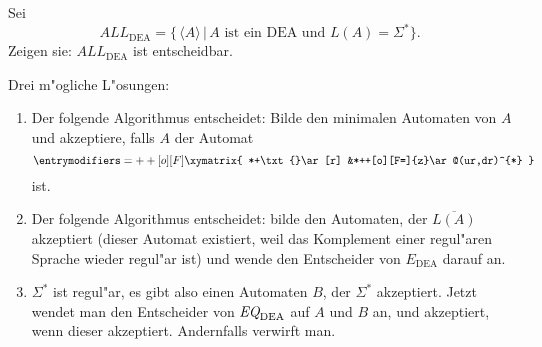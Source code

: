 Sei
\[
{ALL}_{\text{DEA}}=\{\, \langle A\rangle\, |\, \text{$A$ ist ein DEA und $L(A)=\Sigma^*$}\}.
\]
Zeigen sie:
$ALL_{\text{DEA}}$ ist entscheidbar.

\begin{loesung}
Drei m"ogliche L"osungen:
\begin{enumerate}
\item
Der folgende Algorithmus entscheidet: Bilde den minimalen Automaten von
$A$ und akzeptiere, falls $A$ der Automat
\[
\entrymodifiers={++[o][F]}
\xymatrix{
*+\txt{}\ar[r]
        &*++[o][F=]{z}\ar@(ur,dr)^{*}
}
\]
ist.
\item
Der folgende Algorithmus entscheidet: bilde den Automaten, der
$\overline{L(A)}$ akzeptiert (dieser Automat existiert, weil
das Komplement einer regul"aren Sprache wieder regul"ar ist)
und wende den Entscheider von $E_\text{DEA}$ darauf an.
\item
$\Sigma^*$ ist regul"ar, es gibt also einen Automaten $B$, der
$\Sigma^*$ akzeptiert. Jetzt wendet man den Entscheider von
$\text{\it EQ}_{\text{DEA}}$ auf $A$ und $B$ an, und akzeptiert,
wenn dieser akzeptiert. Andernfalls verwirft man.
\qedhere
\end{enumerate}
\end{loesung}
